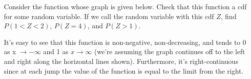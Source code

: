 \begin{examp}
Consider the function whose graph is given below. Check that this function a cdf for some random variable. If we call the random variable with this cdf $Z$, find $P(1 < Z < 2)$, $P(Z = 4)$, and $P(Z > 1)$.

\begin{center}
\end{center}

\par
\noindent It's easy to see that this function is non-negative, non-decreasing, and tends to $0$ as x $\to -\infty$ and 1 as $x \to \infty$ (we're assuming the graph continues off to the left and right along the horizontal lines shown). Furthermore, it's right-continuous since at each jump the value of the function is equal to the limit from the right.
\vspace{0.5em}
\vspace{1.5em}
\end{examp}

